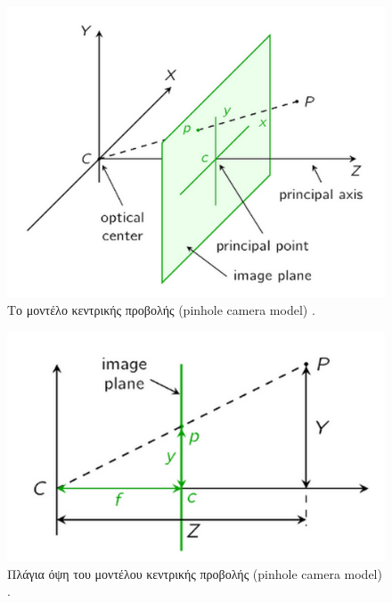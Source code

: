 \begin{figure}[H]
    \centering
    \includegraphics[scale=0.5, angle=0]{Files/Figures/pinhole1.png}
    \caption[Το μοντέλο κεντρικής προβολής (pinhole camera model)]{ Το μοντέλο κεντρικής προβολής (pinhole camera model) \cite{pinhole} .}
    \label{fig:pinhole1}
\end{figure}

\begin{figure}[H]
    \centering
    \includegraphics[scale=0.5, angle=0]{Files/Figures/pinhole2.png}
    \caption[Πλάγια όψη του μοντέλου κεντρικής προβολής (pinhole camera model)]{ Πλάγια όψη του μοντέλου κεντρικής προβολής (pinhole camera model) \cite{pinhole} .}
    \label{fig:pinhole2}
\end{figure}


